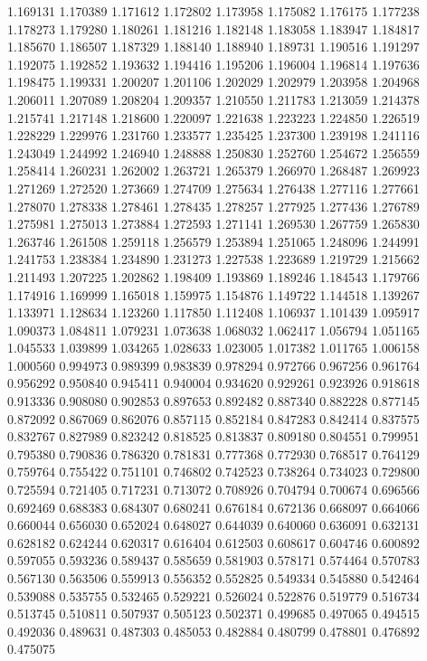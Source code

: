 1.169131
1.170389
1.171612
1.172802
1.173958
1.175082
1.176175
1.177238
1.178273
1.179280
1.180261
1.181216
1.182148
1.183058
1.183947
1.184817
1.185670
1.186507
1.187329
1.188140
1.188940
1.189731
1.190516
1.191297
1.192075
1.192852
1.193632
1.194416
1.195206
1.196004
1.196814
1.197636
1.198475
1.199331
1.200207
1.201106
1.202029
1.202979
1.203958
1.204968
1.206011
1.207089
1.208204
1.209357
1.210550
1.211783
1.213059
1.214378
1.215741
1.217148
1.218600
1.220097
1.221638
1.223223
1.224850
1.226519
1.228229
1.229976
1.231760
1.233577
1.235425
1.237300
1.239198
1.241116
1.243049
1.244992
1.246940
1.248888
1.250830
1.252760
1.254672
1.256559
1.258414
1.260231
1.262002
1.263721
1.265379
1.266970
1.268487
1.269923
1.271269
1.272520
1.273669
1.274709
1.275634
1.276438
1.277116
1.277661
1.278070
1.278338
1.278461
1.278435
1.278257
1.277925
1.277436
1.276789
1.275981
1.275013
1.273884
1.272593
1.271141
1.269530
1.267759
1.265830
1.263746
1.261508
1.259118
1.256579
1.253894
1.251065
1.248096
1.244991
1.241753
1.238384
1.234890
1.231273
1.227538
1.223689
1.219729
1.215662
1.211493
1.207225
1.202862
1.198409
1.193869
1.189246
1.184543
1.179766
1.174916
1.169999
1.165018
1.159975
1.154876
1.149722
1.144518
1.139267
1.133971
1.128634
1.123260
1.117850
1.112408
1.106937
1.101439
1.095917
1.090373
1.084811
1.079231
1.073638
1.068032
1.062417
1.056794
1.051165
1.045533
1.039899
1.034265
1.028633
1.023005
1.017382
1.011765
1.006158
1.000560
0.994973
0.989399
0.983839
0.978294
0.972766
0.967256
0.961764
0.956292
0.950840
0.945411
0.940004
0.934620
0.929261
0.923926
0.918618
0.913336
0.908080
0.902853
0.897653
0.892482
0.887340
0.882228
0.877145
0.872092
0.867069
0.862076
0.857115
0.852184
0.847283
0.842414
0.837575
0.832767
0.827989
0.823242
0.818525
0.813837
0.809180
0.804551
0.799951
0.795380
0.790836
0.786320
0.781831
0.777368
0.772930
0.768517
0.764129
0.759764
0.755422
0.751101
0.746802
0.742523
0.738264
0.734023
0.729800
0.725594
0.721405
0.717231
0.713072
0.708926
0.704794
0.700674
0.696566
0.692469
0.688383
0.684307
0.680241
0.676184
0.672136
0.668097
0.664066
0.660044
0.656030
0.652024
0.648027
0.644039
0.640060
0.636091
0.632131
0.628182
0.624244
0.620317
0.616404
0.612503
0.608617
0.604746
0.600892
0.597055
0.593236
0.589437
0.585659
0.581903
0.578171
0.574464
0.570783
0.567130
0.563506
0.559913
0.556352
0.552825
0.549334
0.545880
0.542464
0.539088
0.535755
0.532465
0.529221
0.526024
0.522876
0.519779
0.516734
0.513745
0.510811
0.507937
0.505123
0.502371
0.499685
0.497065
0.494515
0.492036
0.489631
0.487303
0.485053
0.482884
0.480799
0.478801
0.476892
0.475075
